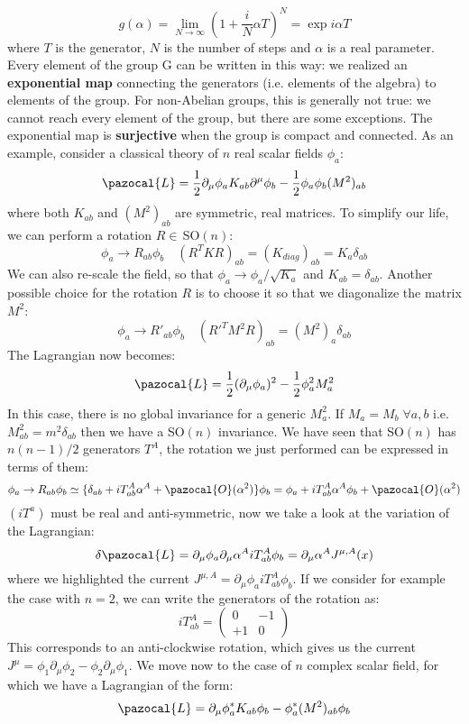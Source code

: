\documentclass[../main.tex]{subfiles}
\begin{document}
\[
g(\alpha)=\lim_{N\to\infty}\left(1+\frac{i}{N}\alpha T\right)^N=\exp{i\alpha T}
\]
where $T$ is the generator, $N$ is the number of steps and $\alpha$ is a real parameter. Every element of the group G can be written in this way: we realized an \textbf{exponential map} connecting the generators (i.e. elements of the algebra) to elements of the group. For non-Abelian groups, this is generally not true: we cannot reach every element of the group, but there are some exceptions. The exponential map is \textbf{surjective} when the group is compact and connected.
\hline
As an example, consider a classical theory of $n$ real scalar fields $\phi_a$:
\[
\pazocal{L}=\frac{1}{2}\partial_\mu\phi_aK_{ab}\partial^\mu\phi_b-\frac{1}{2}\phi_a\phi_b(M^2)_{ab}
\]
where both $K_{ab}$ and $(M^2)_{ab}$ are symmetric, real matrices. To simplify our life, we can perform a rotation $R\in$\,SO$(n)$:
\[
\phi_a\to R_{ab}\phi_b \quad (R^TKR)_{ab}=(K_{diag})_{ab}=K_a\delta_{ab}
\]
We can also re-scale the field, so that $\phi_a\to\phi_a/\sqrt{K_a}$ and $K_{ab}=\delta_{ab}$. Another possible choice for the rotation $R$ is to choose it so that we diagonalize the matrix $M^2$:
\[
\phi_a\to R'_{ab}\phi_b \quad (R'^TM^2R)_{ab}=(M^2)_a\delta_{ab}
\]
The Lagrangian now becomes:
\[
\pazocal{L}=\frac{1}{2}(\partial_\mu\phi_a)^2-\frac{1}{2}\phi_a^2M_a^2
\]
In this case, there is no global invariance for a generic $M_a^2$. If $M_a=M_b\;\forall a,b$ i.e. $M_{ab}^2=m^2\delta_{ab}$ then we have a SO$(n)$ invariance. We have seen that SO$(n)$ has $n(n-1)/2$ generators $T^A$, the rotation we just performed can be expressed in terms of them:
\[
\phi_a\to R_{ab}\phi_b\simeq\{\delta_{ab}+iT_{ab}^A\alpha^A+\pazocal{O}(\alpha^2)\}\phi_b=\phi_a+iT_{ab}^A\alpha^A\phi_b+\pazocal{O}(\alpha^2)
\]
$(iT^a)$ must be real and anti-symmetric, now we take a look at the variation of the Lagrangian:
\[
\delta\pazocal{L}=\partial_\mu\phi_a\partial_\mu\alpha^AiT^A_{ab}\phi_b=\partial_\mu\alpha^AJ^{\mu,A}(x)
\]
where we highlighted the current $J^{\mu,A}=\partial_\mu\phi_aiT_{ab}^A\phi_b$. If we consider for example the case with $n=2$, we can write the generators of the rotation as:
\[
iT_{ab}^A=\left(\begin{array}{cc}
    0 & -1 \\
    +1 & 0
\end{array}\right)
\]
This corresponds to an anti-clockwise rotation, which gives us the current $J^\mu=\phi_1\partial_\mu\phi_2-\phi_2\partial_\mu\phi_1$. We move now to the case of $n$ complex scalar field, for which we have a Lagrangian of the form:
\[
\pazocal{L}=\partial_\mu\phi_a^*K_{ab}\phi_b-\phi_a^*(M^2)_{ab}\phi_b
\]
\end{document}

